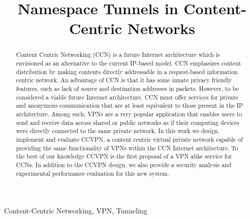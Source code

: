 \documentclass[conference,letterpaper,10pt]{IEEEtran}
\begin{document}
\title{Namespace Tunnels in Content-Centric Networks}

\author{
}

\maketitle


\begin{abstract}
Content Centric Networking (CCN) is a future Internet architecture which is envisioned as
an alternative to the current IP-based model. CCN emphasizes content distribution by making
contents directly addressable in a request-based information centric network. An advantage
of CCN is that it has some innate privacy friendly features, such as lack of source and
destination addresses in packets. However, to be considered a viable future Internet
architecture, CCN must offer services for private and anonymous communication that are
at least equivalent to those present in the IP architecture. Among such, VPNs are a very
popular application that enables users to send and receive data across shared or public
networks as if their computing devices were directly connected to the same private
network. In this work we design, implement and evaluate CCVPN, a content centric
virtual private network capable of providing the same functionality of VPNs within
the CCN Internet architecture. To the best of our knowledge CCVPN is the first proposal
of a VPN alike service for CCNs. In addition to the CCVPN design, we also provide a
security analysis and experimental performance evaluation for this new system.
\end{abstract}

\begin{IEEEkeywords}
Content-Centric Networking, VPN, Tunneling
\end{IEEEkeywords}

\IEEEpeerreviewmaketitle








\end{document}
